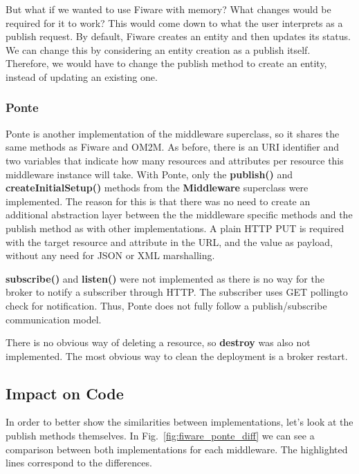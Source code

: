 \documentclass[conference]{IEEEtran}
\begin{document}
But what if we wanted to use Fiware with memory? What changes would be required for it to work? This would come down to what the user interprets as a publish request. By default, Fiware creates an entity and then updates its status. We can change this by considering an entity creation as a publish itself. Therefore, we would have to change the publish method to create an entity, instead of updating an existing one.

%
\subsubsection{Ponte}

Ponte is another implementation of the middleware superclass, so it shares the same methods as Fiware and OM2M.
As before, there is an URI identifier and two variables that indicate how many resources and attributes per resource this middleware instance will take. With Ponte, only the \textbf{publish()} and \textbf{createInitialSetup()} methods from the \textbf{Middleware} superclass were implemented. The reason for this is that there was no need to create an additional abstraction layer between the the middleware specific methods and the publish method as with other implementations. A plain HTTP PUT is required with the target resource and attribute in the URL, and the value as payload, without any need for JSON or XML marshalling.

\textbf{subscribe()} and \textbf{listen()} were not implemented as there is no way for the broker to notify a subscriber through HTTP. The subscriber uses GET pollingto check for notification. Thus, Ponte does not fully follow a publish/subscribe communication model.

There is no obvious way of deleting a resource, so \textbf{destroy} was also not implemented. The most obvious way to clean the deployment is a broker restart. 

\subsection{Impact on Code}

In order to better show the similarities between implementations, let's look at the publish methods themselves. In Fig.~\ref{fig:fiware_ponte_diff} we can see a comparison between both implementations for each middleware. The highlighted lines correspond to the differences.
\end{document}
